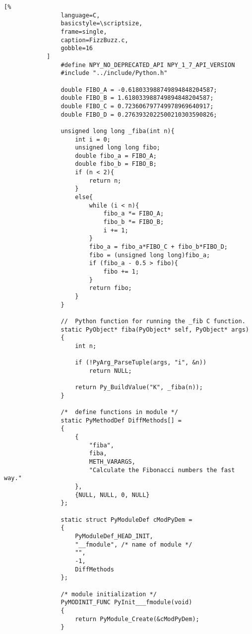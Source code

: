 \documentclass[crop=false,class=book,oneside]{standalone}
\begin{document}
            \begin{lstlisting}[%
                language=C,
                basicstyle=\scriptsize,
                frame=single,
                caption=FizzBuzz.c,
                gobble=16
            ]
                #define NPY_NO_DEPRECATED_API NPY_1_7_API_VERSION
                #include "../include/Python.h"

                double FIBO_A = -0.618033988749894848204587;
                double FIBO_B = 1.618033988749894848204587;
                double FIBO_C = 0.723606797749978969640917;
                double FIBO_D = 0.2763932022500210303590826;
                
                unsigned long long _fiba(int n){
                    int i = 0;
                    unsigned long long fibo;
                    double fibo_a = FIBO_A;
                    double fibo_b = FIBO_B;
                    if (n < 2){
                        return n;
                    }
                    else{
                        while (i < n){
                            fibo_a *= FIBO_A;
                            fibo_b *= FIBO_B;
                            i += 1;
                        }
                        fibo_a = fibo_a*FIBO_C + fibo_b*FIBO_D;
                        fibo = (unsigned long long)fibo_a;
                        if (fibo_a - 0.5 > fibo){
                            fibo += 1;
                        }
                        return fibo;
                    }
                }
                
                //  Python function for running the _fib C function.
                static PyObject* fiba(PyObject* self, PyObject* args)
                {
                    int n;
                
                    if (!PyArg_ParseTuple(args, "i", &n))
                        return NULL;
                
                    return Py_BuildValue("K", _fiba(n));
                }
                
                /*  define functions in module */
                static PyMethodDef DiffMethods[] =
                {
                    {
                        "fiba",
                        fiba,
                        METH_VARARGS,
                        "Calculate the Fibonacci numbers the fast way."
                    },
                    {NULL, NULL, 0, NULL}
                };
                
                static struct PyModuleDef cModPyDem =
                {
                    PyModuleDef_HEAD_INIT,
                    "__fmodule", /* name of module */
                    "",
                    -1,
                    DiffMethods
                };
                
                /* module initialization */
                PyMODINIT_FUNC PyInit___fmodule(void)
                {
                    return PyModule_Create(&cModPyDem);
                }
            \end{lstlisting}
\end{document}
